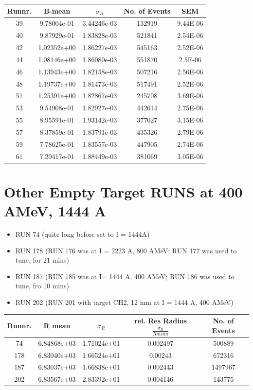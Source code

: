 \documentclass[12pt, letterpaper]{article}
\begin{document}
\begin{tabular}{|c|c|c|c|c|}
\hline
Runnr. & B-mean & $\sigma_{B}$ & No. of Events & SEM \\
\hline
39		&	9.78004e-01 &	3.44246e-03	&	132919	& 9.44E-06 \\
40		&	9.87929e-01	&	1.83828e-03	&	521841	& 2.54E-06 \\
42		&	1.02352e+00	&	1.86227e-03	&	545163	& 2.52E-06 \\
44		& 	1.08146e+00	&	1.86080e-03 &	551870	& 2.5E-06\\
46		&	1.13943e+00	&	1.82158e-03	& 	507216	& 2.56E-06\\
48		&	1.19737e+00	&	1.81473e-03	&	517491	& 2.52E-06\\
51		&	1.25391e+00 &	1.82867e-03	&	245708	& 3.69E-06\\
53		&	9.54908e-01	&	1.82927e-03	&	442614	& 2.75E-06\\
55		&	8.95591e-01	&	1.93142e-03	&	377027	& 3.15E-06\\
57		& 	8.37859e-01	&	1.83791e-03	&	435326	& 2.79E-06\\
59		&   7.78625e-01	&	1.83557e-03	&	447905	& 2.74E-06\\
61		&	7.20417e-01	&	1.88449e-03	&	381069	& 3.05E-06\\

\hline

\end{tabular}

\section{Other Empty Target RUNS at 400 AMeV, 1444 A}
\begin{itemize}
\item RUN 74 (quite long before set to I = 1444A)
\item RUN 178 (RUN 176 was at I = 2223 A, 800 AMeV; RUN 177 was used to tune, for 21 mins)
\item RUN 187 (RUN 185 was at I= 1444 A, 400 AMeV; RUN 186 was used to tune, fro 10 mins)
\item RUN 202 (RUN 201 with target CH2, 12 mm at I = 1444 A, 400 AMeV)
\end{itemize}

\begin{tabular}{|c|c|c|c|c|}
\hline
Runnr. & R mean & $\sigma_{R}$ & rel. Res Radius $\frac{\sigma_{R}}{R mean}$ & No. of Events\\
\hline
74		&	6.84868e+03 	&	1.71024e+01	& 0.002497 &	500889 \\
178		&	6.83040e+03	&	1.66524e+01	& 0.00243 &  672316	 \\
187 		&	6.83037e+03	&	1.66838e+01	& 0.002443 & 1497967	 \\
202		&	6.83567e+03 	&	2.83392e+01	& 0.004146 & 143775 	 \\


\hline

\end{tabular}
\end{document}
